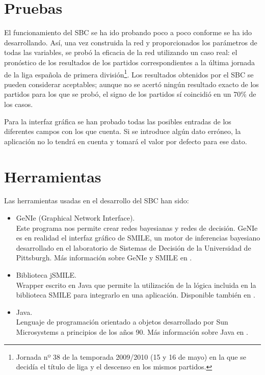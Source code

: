 \documentclass[a4paper,12pt]{article}
\begin{document}
\section{Pruebas}
\par
El funcionamiento del SBC se ha ido probando poco a poco conforme se ha ido desarrollando.
Así, una vez construida la red y proporcionados los parámetros de todas las variables,
se probó la eficacia de la red utilizando un caso real:
el pronóstico de los resultados de los partidos correspondientes a la última jornada de la liga española de primera división\footnote{Jornada nº 38 de la temporada 2009/2010 (15 y 16 de mayo) en la que se decidía el título de liga y el descenso en los mismos partidos.}.
Los resultados obtenidos por el SBC se pueden considerar aceptables;
aunque no se acertó ningún resultado exacto de los partidos para los que se probó,
el signo de los partidos sí coincidió en un 70\% de los casos.
\par
Para la interfaz gráfica se han probado todas las posibles entradas de los diferentes campos con los que cuenta.
Si se introduce algún dato erróneo, la aplicación no lo tendrá en cuenta y tomará el valor por defecto para ese dato.

\section{Herramientas}
Las herramientas usadas en el desarrollo del SBC han sido:
\begin{itemize}
 \item GeNIe (Graphical Network Interface).\\
  Este programa nos permite crear redes bayesianas y redes de decisión.
GeNIe es en realidad el interfaz gráfico de SMILE, un motor de inferencias bayesiano desarrollado en el laboratorio de Sistemas de Decisión de la Universidad de Pittsburgh.
Más información sobre GeNIe y SMILE en \cite{GNISMILE}.
 \item Biblioteca jSMILE.\\
  Wrapper escrito en Java que permite la utilización de la lógica incluida en la biblioteca SMILE para integrarlo en una aplicación.
Disponible también en \cite{GNISMILE}.
 \item Java.\\
Lenguaje de programación orientado a objetos desarrollado por Sun Microsystems a principios de los años 90.
Más información sobre Java en \cite{JAVA}.
\end{itemize}
\end{document}
